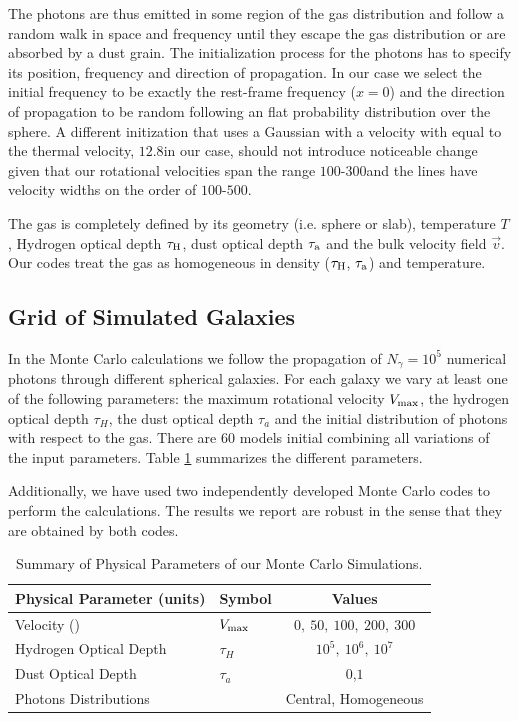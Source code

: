 \documentclass{emulateapj}
\newcommand{\ly}{{\ifmmode{{\rm Ly}\alpha~}\else{Ly$\alpha$~}\fi}}
\newcommand{\kms}{{\ifmmode{{\mathrm{\,km\ s}^{-1}}}\else{\,km~s$^{-1}$}\fi}}
\begin{document}
The photons are thus emitted in some region of the gas distribution
and follow a random walk in space and frequency until they escape the
gas distribution or are absorbed by a dust grain. The initialization
process for the \ly photons has to specify its position, frequency and
direction of propagation. In our case we select the initial frequency
to be exactly the \ly rest-frame frequency ($x=0$) and the direction of
propagation to be random following an flat probability distribution
over the sphere. A different initization that uses a Gaussian with a
velocity with equal to the thermal velocity, $12.8$\kms in our case,
should not introduce noticeable change given that our rotational
velocities span the range $100$-$300$\kms and the lines have velocity
widths on the order of $100$-$500$\kms.

The gas is completely defined by its geometry (i.e. sphere or slab),
temperature $T$, Hydrogen optical depth $\tau_{\rm H}$, dust optical
depth $\tau_{\rm a}$ and the bulk velocity field $\vec{v}$. Our codes
treat the gas as homogeneous in density ($\tau_{\rm H}$, $\tau_{\rm
  a}$) and temperature.  


\subsection{Grid of Simulated Galaxies}
\label{sec:models}

In the Monte Carlo calculations we follow the propagation of $N_{\gamma}=10^5$
numerical photons through different spherical galaxies. For each galaxy
we vary at least one of the following parameters: the maximum
rotational velocity $V_{\rm max}$, the hydrogen optical depth $\tau_{H}$,
the dust optical depth $\tau_{a}$ and the initial distribution of photons
with respect to the gas. There are $60$ models initial combining all
variations of the input parameters. Table \ref{table:models}
summarizes the different parameters.

Additionally, we have used two independently developed Monte Carlo
codes \citep{CLARA,DijkstraKramer} to perform the calculations. The
results we report are robust in the sense that they are obtained by
both codes.  

\begin{table}
\begin{center}
\begin{tabular}{llc}\hline\hline
Physical Parameter (units) & Symbol & Values\\\hline
Velocity (\kms) & $V_{\rm max}$&$0,\ 50,\ 100,\ 200,\ 300$\\
Hydrogen Optical Depth & $\tau_{H} $ & $10^{5},\ 10^{6},\ 10^{7}$\\
Dust Optical Depth & $\tau_{a}$ & $0$,$1$\\
Photons Distributions & & Central, Homogeneous\\\hline\hline
\end{tabular}
\caption{
  Summary of Physical Parameters of our Monte Carlo Simulations.} 
\label{table:models}
\end{center}
\end{table}
\end{document}
